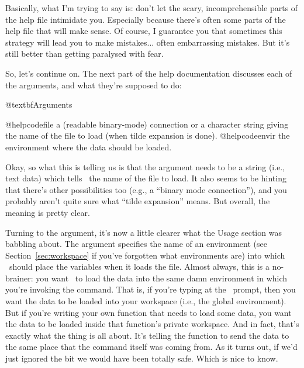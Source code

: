Basically, what I'm trying to say is: don't let the scary, incomprehensible parts of the help file intimidate you. Especially because there's often some parts of the help file that will make sense. Of course, I guarantee you that sometimes this strategy will lead you to make mistakes... often embarrassing mistakes. But it's still better than getting paralysed with fear.  

So, let's continue on. The next part of the help documentation discusses each of the arguments, and what they're supposed to do:
\begin{rhelp1}

@textbf{Arguments}

@helpcode{file}	a (readable binary-mode) connection or a character string giving the name
		of the file to load (when tilde expansion is done).
@helpcode{envir}	the environment where the data should be loaded.

\end{rhelp1}
Okay, so what this is telling us is that the  argument needs to be a string (i.e., text data) which tells \R\ the name of the file to load. It also seems to be hinting that there's other possibilities too (e.g., a ``binary mode connection''), and you probably aren't quite sure what ``tilde expansion'' means. But overall, the meaning is pretty clear. 

Turning to the  argument, it's now a little clearer what the Usage section was babbling about. The  argument specifies the name of an environment (see Section~\ref{sec:workspace} if you've forgotten what environments are) into which \R\ should place the variables when it loads the file. Almost always, this is a no-brainer: you want \R\ to load the data into the same damn environment in which you're invoking the  command. That is, if you're typing  at the \R\ prompt, then you want the data to be loaded into your workspace (i.e., the global environment). But if you're writing your own function that needs to load some data, you want the data to be loaded inside that function's private workspace. And in fact, that's exactly what the  thing is all about. It's telling the  function to send the data to the same place that the  command itself was coming from. As it turns out, if we'd just ignored the  bit we would have been totally safe.  Which is nice to know. 

